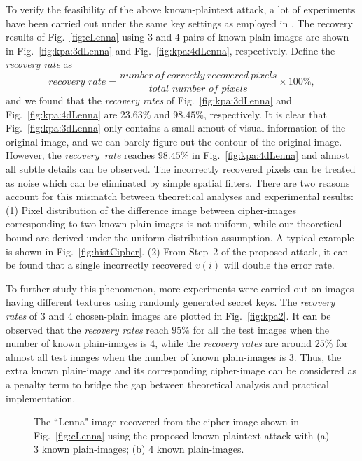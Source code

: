 \documentclass[smallextended, final]{svjour3}          \smartqed
\newlength\imagewidth
\begin{document}
To verify the feasibility of the above known-plaintext attack, a lot of experiments have been carried out under the same key settings as employed in \cite[Sec.~4.1]{li2012image}.
The recovery results of Fig.~\ref{fig:cLenna} using $3$ and $4$ pairs of known plain-images are shown in Fig.~\ref{fig:kpa:3dLenna} and Fig.~\ref{fig:kpa:4dLenna},
respectively. Define the \textit{recovery rate} as
\begin{equation*}
\textit{recovery~rate} = \frac{number~of~correctly~recovered~pixels}{\textit{total~number~of~pixels}} \times 100\%,
\end{equation*}
and we found that the \textit{recovery rates} of Fig.~\ref{fig:kpa:3dLenna} and Fig.~\ref{fig:kpa:4dLenna} are $23.63\%$  and $98.45\%$, respectively.
It is clear that Fig.~\ref{fig:kpa:3dLenna} only contains a small amout of visual information of the original image, and we can barely figure out the contour of the original image.
However, the \textit{recovery~rate} reaches $98.45\%$ in Fig.~\ref{fig:kpa:4dLenna} and almost all subtle details can be observed.
The incorrectly recovered pixels can be treated as noise which can be eliminated by simple spatial filters. There are two reasons account for this mismatch between theoretical analyses and
experimental results: (1) Pixel distribution of the difference image between cipher-images corresponding to two known plain-images is not uniform, while our theoretical bound
are derived under the uniform distribution assumption. A typical example is shown in Fig.~\ref{fig:histCipher}.
(2) From Step~2 of the proposed attack, it can be found that a single incorrectly recovered $v(i)$ will double the error rate.

To further study this phenomenon, more experiments were carried out on images having different textures using randomly generated secret keys.
The \textit{recovery rates} of $3$ and $4$ chosen-plain images are plotted in Fig.~\ref{fig:kpa2}.
It can be observed that the \textit{recovery rates} reach $95\%$ for all the test images when the number of known plain-images is $4$, while
the \textit{recovery rates} are around $25\%$ for almost all test images when the number of known plain-images is $3$. Thus, the extra known plain-image and its corresponding cipher-image
can be considered as a penalty term to bridge the gap between theoretical analysis and practical implementation.

\begin{figure}[!htb]
\centering
{}
\caption{The ``Lenna" image recovered from the cipher-image shown in Fig.~\ref{fig:cLenna} using the proposed known-plaintext attack with
(a) $3$ known plain-images;
(b) $4$ known plain-images.}
\label{fig:kpa}
\end{figure}
\end{document}
